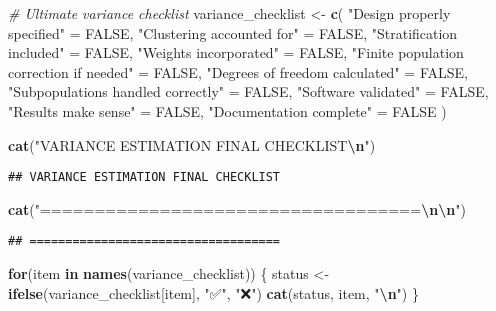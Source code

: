 \documentclass[
]{article}
\newenvironment{Shaded}{\begin{snugshade}}{\end{snugshade}}
\newcommand{\CommentTok}[1]{\textcolor[rgb]{0.56,0.35,0.01}{\textit{#1}}}
\newcommand{\ConstantTok}[1]{\textcolor[rgb]{0.56,0.35,0.01}{#1}}
\newcommand{\ControlFlowTok}[1]{\textcolor[rgb]{0.13,0.29,0.53}{\textbf{#1}}}
\newcommand{\FunctionTok}[1]{\textcolor[rgb]{0.13,0.29,0.53}{\textbf{#1}}}
\newcommand{\NormalTok}[1]{#1}
\newcommand{\OtherTok}[1]{\textcolor[rgb]{0.56,0.35,0.01}{#1}}
\newcommand{\SpecialCharTok}[1]{\textcolor[rgb]{0.81,0.36,0.00}{\textbf{#1}}}
\newcommand{\StringTok}[1]{\textcolor[rgb]{0.31,0.60,0.02}{#1}}
\begin{document}
\begin{Shaded}
\begin{Highlighting}[]
\CommentTok{\# Ultimate variance checklist}
\NormalTok{variance\_checklist }\OtherTok{\textless{}{-}} \FunctionTok{c}\NormalTok{(}
  \StringTok{"Design properly specified"} \OtherTok{=} \ConstantTok{FALSE}\NormalTok{,}
  \StringTok{"Clustering accounted for"} \OtherTok{=} \ConstantTok{FALSE}\NormalTok{,}
  \StringTok{"Stratification included"} \OtherTok{=} \ConstantTok{FALSE}\NormalTok{,}
  \StringTok{"Weights incorporated"} \OtherTok{=} \ConstantTok{FALSE}\NormalTok{,}
  \StringTok{"Finite population correction if needed"} \OtherTok{=} \ConstantTok{FALSE}\NormalTok{,}
  \StringTok{"Degrees of freedom calculated"} \OtherTok{=} \ConstantTok{FALSE}\NormalTok{,}
  \StringTok{"Subpopulations handled correctly"} \OtherTok{=} \ConstantTok{FALSE}\NormalTok{,}
  \StringTok{"Software validated"} \OtherTok{=} \ConstantTok{FALSE}\NormalTok{,}
  \StringTok{"Results make sense"} \OtherTok{=} \ConstantTok{FALSE}\NormalTok{,}
  \StringTok{"Documentation complete"} \OtherTok{=} \ConstantTok{FALSE}
\NormalTok{)}

\FunctionTok{cat}\NormalTok{(}\StringTok{"VARIANCE ESTIMATION FINAL CHECKLIST}\SpecialCharTok{\textbackslash{}n}\StringTok{"}\NormalTok{)}
\end{Highlighting}
\end{Shaded}

\begin{verbatim}
## VARIANCE ESTIMATION FINAL CHECKLIST
\end{verbatim}

\begin{Shaded}
\begin{Highlighting}[]
\FunctionTok{cat}\NormalTok{(}\StringTok{"===================================}\SpecialCharTok{\textbackslash{}n\textbackslash{}n}\StringTok{"}\NormalTok{)}
\end{Highlighting}
\end{Shaded}

\begin{verbatim}
## ===================================
\end{verbatim}

\begin{Shaded}
\begin{Highlighting}[]
\ControlFlowTok{for}\NormalTok{(item }\ControlFlowTok{in} \FunctionTok{names}\NormalTok{(variance\_checklist)) \{}
\NormalTok{  status }\OtherTok{\textless{}{-}} \FunctionTok{ifelse}\NormalTok{(variance\_checklist[item], }\StringTok{"✅"}\NormalTok{, }\StringTok{"❌"}\NormalTok{)}
  \FunctionTok{cat}\NormalTok{(status, item, }\StringTok{"}\SpecialCharTok{\textbackslash{}n}\StringTok{"}\NormalTok{)}
\NormalTok{\}}
\end{Highlighting}
\end{Shaded}
\end{document}
